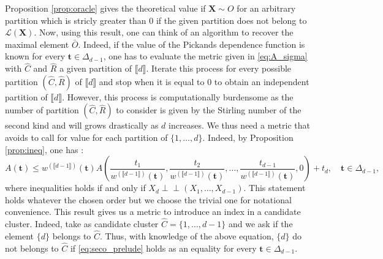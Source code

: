 \documentclass[11pt]{article}
\theoremstyle{definition}
\newcommand{\indep}{\perp \!\!\! \perp}
\begin{document}
	Proposition \ref{prop:oracle} gives the theoretical value if $\textbf{X} \sim O$ for an arbitrary partition which is stricly greater than $0$ if the given partition does not belong to $\mathcal{L}(\textbf{X})$. Now, using this result, one can think of an algorithm to recover the maximal element $\bar{O}$. Indeed, if the value of the Pickands dependence function is known for every $\textbf{t} \in \Delta_{d-1}$, one has to evaluate the metric given in \eqref{eq:A_sigma} with $\hat{C}$ and $\hat{R}$ a given partition of $\llbracket d \rrbracket$. Iterate this process for every possible partition $(\hat{C}, \hat{R})$ of $\llbracket d \rrbracket$ and stop when it is equal to $0$ to obtain an independent partition of $\llbracket d \rrbracket$. However, this process is computationally burdensome as the number of partition $(\hat{C}, \hat{R})$ to consider is given by the Stirling number of the second kind and will grows drastically as $d$ increases. We thus need a metric that avoids to call for value for each partition of $\{1,\dots,d\}$. Indeed, by Proposition \ref{prop:ineq}, one has :
	\begin{equation}
		\label{eq:seco_prelude}
		A(\textbf{t}) \leq w^{(\llbracket d-1 \rrbracket)}(\textbf{t}) A\left(\frac{t_1}{w^{(\llbracket d-1 \rrbracket)}(\textbf{t})}, \frac{t_2}{w^{(\llbracket d-1 \rrbracket)}(\textbf{t})} ,\dots, \frac{t_{d-1}}{w^{(\llbracket d-1 \rrbracket)}(\textbf{t})}, 0\right) + t_d , \quad \textbf{t} \in \Delta_{d-1},
	\end{equation}
	where inequalities holds if and only if $X_d \indep (X_1,\dots, X_{d-1})$. This statement holds whatever the chosen order but we choose the trivial one for notational convenience. This result gives us a metric to introduce an index in a candidate cluster. Indeed, take as candidate cluster $\hat{C} = \{1,\dots,d-1\}$ and we ask if the element $\{d\}$ belongs to $\hat{C}$. Thus, with knowledge of the above equation, $\{d\}$ do not belongs to $\hat{C}$ if \eqref{eq:seco_prelude} holds as an equality for every $\textbf{t} \in \Delta_{d-1}$.
	
\end{document}
